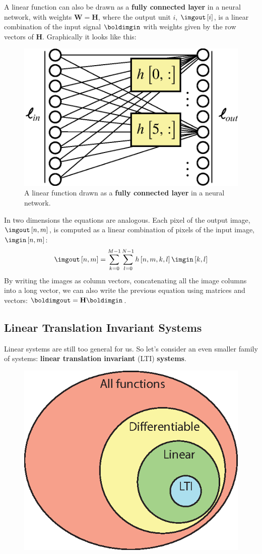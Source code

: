 A linear function can also be drawn as a {\bf fully connected layer} in a neural network, with weights $\mathbf{W} = \mathbf{H}$, where the output unit $i$, $\imgout \left[i \right]$, is a linear combination of the input signal $\boldimgin$ with weights given by the row vectors of $\mathbf{H}$. Graphically it looks like this:

\begin{figure}[h!]
\centerline{
\includegraphics[width=.4\linewidth]{figures/linear_image_filtering/linear_filter.eps}
} 
\caption{A linear function drawn as a {\bf fully connected layer} in a neural network.}
\end{figure}

In two dimensions the equations are analogous. Each pixel of the output
image, $\imgout \left[n,m\right]$, is computed as a linear combination of pixels of the input image, $\imgin \left[n, m\right]$:
\begin{equation}
\imgout \left[n,m \right] = \sum_{k=0}^{M-1} \sum_{l=0}^{N-1} h \left[n,m,k,l \right] \imgin \left[k,l \right]
\label{eq:lin}
\end{equation}
By writing the images as column vectors, concatenating all the image columns into a long vector, we can also write the previous equation using matrices and vectors: $\boldimgout =  \mathbf{H} \boldimgin$.

\subsection{Linear Translation Invariant Systems}



Linear systems are still too general for us. So let's consider an even smaller family of systems: {\bf linear translation invariant} (LTI) {\bf systems}.

\begin{figure}
\centerline{
\includegraphics[width=.25\linewidth]{figures/linear_image_filtering/space_of_functions.eps}
}
\end{figure}

